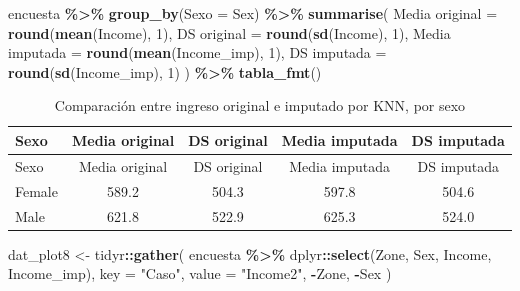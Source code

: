 \documentclass[
  spanish,
  12pt,
]{book}
\newenvironment{Shaded}{\begin{snugshade}}{\end{snugshade}}
\newcommand{\AttributeTok}[1]{\textcolor[rgb]{0.13,0.29,0.53}{#1}}
\newcommand{\DecValTok}[1]{\textcolor[rgb]{0.00,0.00,0.81}{#1}}
\newcommand{\FunctionTok}[1]{\textcolor[rgb]{0.13,0.29,0.53}{\textbf{#1}}}
\newcommand{\NormalTok}[1]{#1}
\newcommand{\OtherTok}[1]{\textcolor[rgb]{0.56,0.35,0.01}{#1}}
\newcommand{\SpecialCharTok}[1]{\textcolor[rgb]{0.81,0.36,0.00}{\textbf{#1}}}
\newcommand{\StringTok}[1]{\textcolor[rgb]{0.31,0.60,0.02}{#1}}
\begin{document}
\begin{Shaded}
\begin{Highlighting}[]
\NormalTok{encuesta }\SpecialCharTok{\%\textgreater{}\%}
  \FunctionTok{group\_by}\NormalTok{(}\AttributeTok{Sexo =}\NormalTok{ Sex) }\SpecialCharTok{\%\textgreater{}\%}
  \FunctionTok{summarise}\NormalTok{(}
    \StringTok{\textasciigrave{}}\AttributeTok{Media original}\StringTok{\textasciigrave{}}  \OtherTok{=} \FunctionTok{round}\NormalTok{(}\FunctionTok{mean}\NormalTok{(Income), }\DecValTok{1}\NormalTok{),}
    \StringTok{\textasciigrave{}}\AttributeTok{DS original}\StringTok{\textasciigrave{}}     \OtherTok{=} \FunctionTok{round}\NormalTok{(}\FunctionTok{sd}\NormalTok{(Income), }\DecValTok{1}\NormalTok{),}
    \StringTok{\textasciigrave{}}\AttributeTok{Media imputada}\StringTok{\textasciigrave{}}  \OtherTok{=} \FunctionTok{round}\NormalTok{(}\FunctionTok{mean}\NormalTok{(Income\_imp), }\DecValTok{1}\NormalTok{),}
    \StringTok{\textasciigrave{}}\AttributeTok{DS imputada}\StringTok{\textasciigrave{}}     \OtherTok{=} \FunctionTok{round}\NormalTok{(}\FunctionTok{sd}\NormalTok{(Income\_imp), }\DecValTok{1}\NormalTok{)}
\NormalTok{  ) }\SpecialCharTok{\%\textgreater{}\%} \FunctionTok{tabla\_fmt}\NormalTok{()}
\end{Highlighting}
\end{Shaded}

\begin{longtable}[]{@{}lcccc@{}}
\caption{\label{tab:tab-sesgo-knn-sexo}Comparación entre ingreso original e imputado por KNN, por sexo}\tabularnewline
\toprule\noalign{}
Sexo & Media original & DS original & Media imputada & DS imputada \\
\midrule\noalign{}
\endfirsthead
\toprule\noalign{}
Sexo & Media original & DS original & Media imputada & DS imputada \\
\midrule\noalign{}
\endhead
\bottomrule\noalign{}
\endlastfoot
Female & 589.2 & 504.3 & 597.8 & 504.6 \\
Male & 621.8 & 522.9 & 625.3 & 524.0 \\
\end{longtable}

\begin{Shaded}
\begin{Highlighting}[]
\NormalTok{dat\_plot8 }\OtherTok{\textless{}{-}}\NormalTok{ tidyr}\SpecialCharTok{::}\FunctionTok{gather}\NormalTok{(}
\NormalTok{  encuesta }\SpecialCharTok{\%\textgreater{}\%}\NormalTok{ dplyr}\SpecialCharTok{::}\FunctionTok{select}\NormalTok{(Zone, Sex, Income, Income\_imp),}
  \AttributeTok{key =} \StringTok{"Caso"}\NormalTok{, }\AttributeTok{value =} \StringTok{"Income2"}\NormalTok{, }\SpecialCharTok{{-}}\NormalTok{Zone, }\SpecialCharTok{{-}}\NormalTok{Sex}
\NormalTok{)}
\end{Highlighting}
\end{Shaded}
\end{document}
